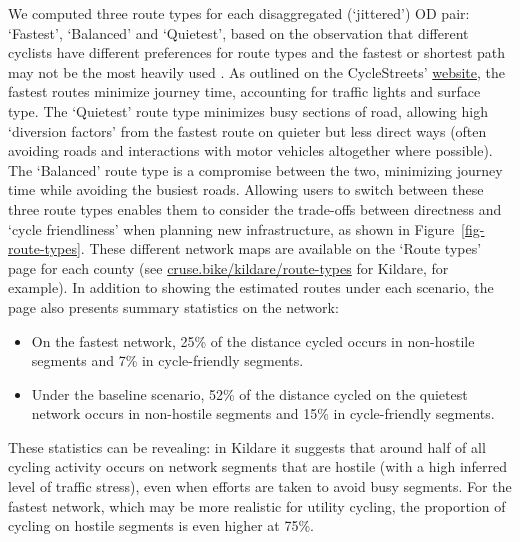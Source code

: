 \documentclass[
  super,
  preprint,
  3p]{elsarticle}
\begin{document}
We computed three route types for each disaggregated (`jittered') OD
pair: `Fastest', `Balanced' and `Quietest', based on the observation
that different cyclists have different preferences for route types and
the fastest or shortest path may not be the most heavily used
\citep{desjardins2022}. As outlined on the CycleStreets'
\href{https://www.cyclestreets.net/help/journey/howitworks/}{website},
the fastest routes minimize journey time, accounting for traffic lights
and surface type. The `Quietest' route type minimizes busy sections of
road, allowing high `diversion factors' from the fastest route on
quieter but less direct ways (often avoiding roads and interactions with
motor vehicles altogether where possible). The `Balanced' route type is
a compromise between the two, minimizing journey time while avoiding the
busiest roads. Allowing users to switch between these three route types
enables them to consider the trade-offs between directness and `cycle
friendliness' when planning new infrastructure, as shown in
Figure~\ref{fig-route-types}. These different network maps are available
on the `Route types' page for each county (see
\href{https://cruse.bike/kildare/route-types}{cruse.bike/kildare/route-types}
for Kildare, for example). In addition to showing the estimated routes
under each scenario, the page also presents summary statistics on the
network:

\begin{itemize}
\item
  On the fastest network, 25\% of the distance cycled occurs in
  non-hostile segments and 7\% in cycle-friendly segments.
\item
  Under the baseline scenario, 52\% of the distance cycled on the
  quietest network occurs in non-hostile segments and 15\% in
  cycle-friendly segments.
\end{itemize}

These statistics can be revealing: in Kildare it suggests that around
half of all cycling activity occurs on network segments that are hostile
(with a high inferred level of traffic stress), even when efforts are
taken to avoid busy segments. For the fastest network, which may be more
realistic for utility cycling, the proportion of cycling on hostile
segments is even higher at 75\%.
\end{document}
